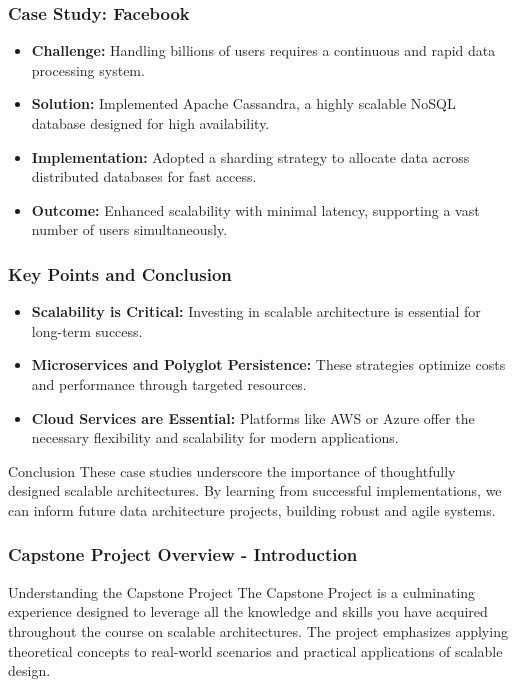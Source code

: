\documentclass[aspectratio=169]{beamer}
\begin{document}
\begin{frame}[fragile]
    \frametitle{Case Study: Facebook}
    \begin{itemize}
        \item \textbf{Challenge:} Handling billions of users requires a continuous and rapid data processing system.
        \item \textbf{Solution:} Implemented Apache Cassandra, a highly scalable NoSQL database designed for high availability.
        \item \textbf{Implementation:} Adopted a sharding strategy to allocate data across distributed databases for fast access.
        \item \textbf{Outcome:} Enhanced scalability with minimal latency, supporting a vast number of users simultaneously.
    \end{itemize}
\end{frame}

\begin{frame}[fragile]
    \frametitle{Key Points and Conclusion}
    \begin{itemize}
        \item \textbf{Scalability is Critical:} Investing in scalable architecture is essential for long-term success.
        \item \textbf{Microservices and Polyglot Persistence:} These strategies optimize costs and performance through targeted resources.
        \item \textbf{Cloud Services are Essential:} Platforms like AWS or Azure offer the necessary flexibility and scalability for modern applications.
    \end{itemize}
    \begin{block}{Conclusion}
        These case studies underscore the importance of thoughtfully designed scalable architectures. By learning from successful implementations, we can inform future data architecture projects, building robust and agile systems.
    \end{block}
\end{frame}

\begin{frame}[fragile]
    \frametitle{Capstone Project Overview - Introduction}
    \begin{block}{Understanding the Capstone Project}
    The Capstone Project is a culminating experience designed to leverage all the knowledge and skills you have acquired throughout the course on scalable architectures. The project emphasizes applying theoretical concepts to real-world scenarios and practical applications of scalable design.
    \end{block}
\end{frame}
\end{document}
